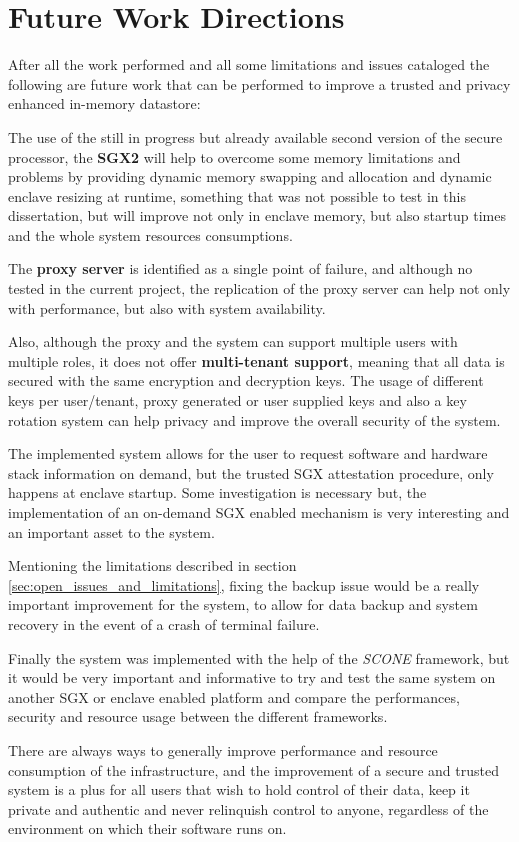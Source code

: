 \section{Future Work Directions}
\label{sec:future_work_directions}

After all the work performed and all some limitations and issues cataloged the following are future work that can be performed to improve a trusted and privacy enhanced in-memory datastore:

The use of the still in progress but already available second version of the secure processor, the \textbf{\gls{SGX}2} will help to overcome some memory limitations and problems by providing dynamic memory swapping and allocation and dynamic enclave resizing at runtime, something that was not possible to test in this dissertation, but will improve not only in enclave memory, but also startup times and the whole system resources consumptions.

The \textbf{proxy server} is identified as a single point of failure, and although no tested in the current project, the replication of the proxy server can help not only with performance, but also with system availability.

Also, although the proxy and the system can support multiple users with multiple roles, it does not offer \textbf{multi-tenant support}, meaning that all data is secured with the same encryption and decryption keys. The usage of different keys per user/tenant, proxy generated or user supplied keys and also a key rotation system can help privacy and improve the overall security of the system.

The implemented system allows for the user to request software and hardware stack information on demand, but the trusted \gls{SGX} attestation procedure, only happens at enclave startup. Some investigation is necessary but, the implementation of an on-demand \gls{SGX} enabled mechanism is very interesting and an important asset to the system.

Mentioning the limitations described in section \ref{sec:open_issues_and_limitations}, fixing the backup issue would be a really important improvement for the system, to allow for data backup and system recovery in the event of a crash of terminal failure.

Finally the system was implemented with the help of the \textit{SCONE} framework, but it would be very important and informative to try and test the same system on another \gls{SGX} or enclave enabled platform and compare the performances, security and resource usage between the different frameworks.

There are always ways to generally improve performance and resource consumption of the infrastructure, and the improvement of a secure and trusted system is a plus for all users that wish to hold control of their data, keep it private and authentic and never relinquish control to anyone, regardless of the environment on which their software runs on.